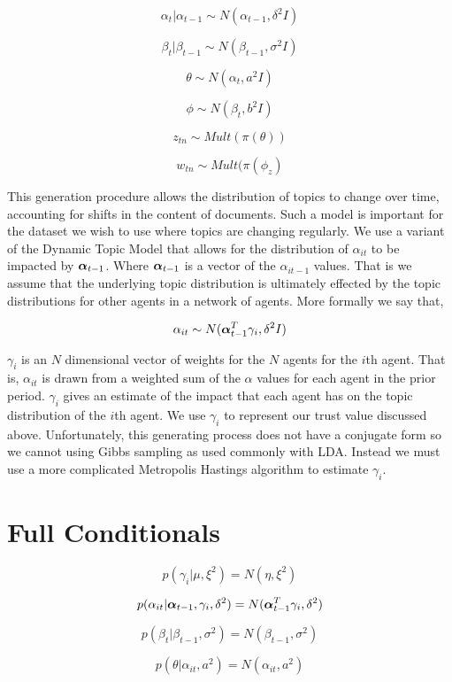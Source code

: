 \documentclass[a4paper]{article}
\begin{document}
\[\alpha_t | \alpha_{t-1} \sim N(\alpha_{t-1}, \delta^2I)\]

\[\beta_t | \beta_{t-1} \sim N(\beta_{t-1}, \sigma^2I)\]

\[\theta \sim N(\alpha_t, a^2I)\]

\[\phi \sim N(\beta_t, b^2I)\]

\[z_{tn} \sim Mult(\pi(\theta))\]

\[w_{tn} \sim Mult(\pi(\phi_z)\]

This generation procedure allows the distribution of topics to change over time, accounting for shifts in the content of documents.  Such a model is important for the dataset we wish to use where topics are changing regularly.  We use a variant of the Dynamic Topic Model that allows for the distribution of $\alpha_{it}$ to be impacted by $\text{\boldmath$\alpha$}_{t-1}$.  Where $\text{\boldmath$\alpha$}_{t-1}$ is a vector of the $\alpha_{it-1}$ values.  That is we assume that the underlying topic distribution is ultimately effected by the topic distributions for other agents in a network of agents.  More formally we say that,

\[\alpha_{it} \sim N(\text{\boldmath$\alpha$}_{t-1}^T \gamma_i, \delta^2I)\]

$\gamma_i$ is an $N$ dimensional vector of weights for the $N$ agents for the $i$th agent.  That is, $\alpha_{it}$ is drawn from a weighted sum of the $\alpha$ values for each agent in the prior period.  $\gamma_i$ gives an estimate of the impact that each agent has on the topic distribution of the $i$th agent.  We use $\gamma_i$ to represent our trust value discussed above.  Unfortunately, this generating process does not have a conjugate form so we cannot using Gibbs sampling as used commonly with LDA.  Instead we must use a more complicated Metropolis Hastings algorithm to estimate $\gamma_i$.

\newpage
\appendix

\section{Full Conditionals}

\[p(\gamma_i | \mu, \xi^2) = N(\eta, \xi^2)\]

\[p(\alpha_{it} | \text{\boldmath$\alpha$}_{t-1}, \gamma_i, \delta^2) = N(\text{\boldmath$\alpha$}^T_{t-1} \gamma_i, \delta^2)\]

\[p(\beta_t | \beta_{t-1}, \sigma^2) = N(\beta_{t-1}, \sigma^2)\]

\[p(\theta | \alpha_{it}, a^2) = N(\alpha_{it}, a^2)\] 
\end{document}
